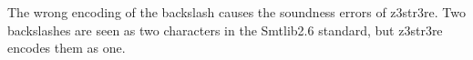 








The wrong encoding of the backslash causes the soundness errors of z3str3re. Two backslashes are seen as two characters in the Smtlib2.6 standard, but z3str3re encodes them as one.